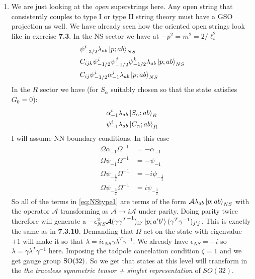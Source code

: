 \documentclass[11pt, class=article, crop=false]{standalone}
\begin{document}
\begin{enumerate}
	\item We are just looking at the \emph{open} superstrings here. Any open string that consistently couples to type I or type II string theory must have a GSO projection as well. We have already seen how the oriented open strings look like in exercise \textbf{7.3}. In the NS sector we have at $-p^2 = m^2 = 2/\ell_s^2$
	\begin{equation}\label{eq:NStype1}
		\begin{aligned}
			&\psi_{-3/2}^i \lambda_{ab} \ket{p; ab}_{NS}\\
			&C_{ijk} \psi_{-1/2}^i \psi_{-1/2}^j \psi_{-1/2}^k \lambda_{ab} \ket{p; ab}_{NS}\\
			&C_{ij} \psi_{-1/2}^i \alpha_{-1}^j \lambda_{ab} \ket{p; ab}_{NS}
		\end{aligned}
	\end{equation}
	 In the $R$ sector we have (for $S_\alpha$ suitably chosen so that the state satisfies $G_0 = 0$):
	 \begin{equation}\label{eq:Rtype1}
	 	\begin{aligned}
	 		& \alpha_{-1}^i \lambda_{ab} \ket{S_\alpha; ab}_{R}\\
			& \psi_{-1}^i \lambda_{ab} \ket{C_\alpha; ab}_{R}
	 	\end{aligned}
	 \end{equation}
	I will assume NN boundary conditions. In this case
	\[
	\begin{aligned}
		\Omega \alpha_{-1} \Omega^{-1} &= - \alpha_{-1}\\
		\Omega \psi_{-1} \Omega^{-1} &= - \psi_{-1}\\
		\Omega \psi_{-\frac12} \Omega^{-1} &= -i \psi_{-\frac12}\\
		\Omega \psi_{-\frac32} \Omega^{-1} &= i \psi_{-\frac32}
	\end{aligned}
	\]
	So all of the terms in \eqref{eq:NStype1} are terms of the form $\mathcal A \lambda_{ab} \ket{p; ab}_{NS}$ with the operator $\mathcal A$ transforming as $\mathcal A \to i \mathcal A$ under parity. Doing parity twice therefore will generate a $- \epsilon_{NS}^2 \mathcal A (\gamma {\gamma^T}^{-1})_{ii'} \ket{p; a'b'} (\gamma^T {\gamma}^{-1})_{j'j}$. This is exactly the same as in \textbf{7.3.10}.  %
	Demanding that $\Omega$ act on the state with eigenvalue $+1$ will make it so that $\lambda = i \epsilon_{NS} \gamma \lambda^{T} \gamma^{-1}$. We already have $\epsilon_{NS} = -i$ so $\lambda = \gamma \lambda^T \gamma^{-1}$ here. %
	Imposing the tadpole cancelation condition $\zeta = 1$ and we get gauge group $\mathrm{SO}(32)$. So we get that states at this level will transform in the  \emph{the traceless symmetric tensor + singlet representation} of $SO(32)$.
	

\end{enumerate}
\end{document}
